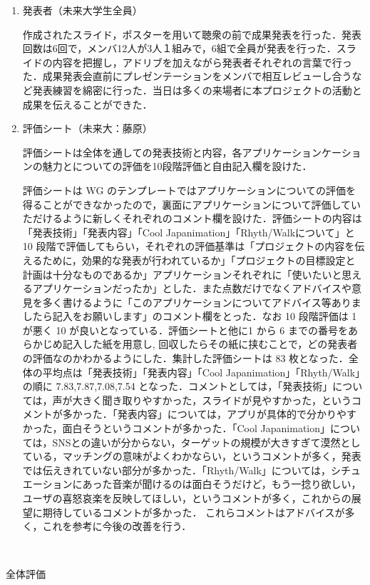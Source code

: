 \begin{enumerate}
\item 発表者（未来大学生全員）
\par
作成されたスライド，ポスターを用いて聴衆の前で成果発表を行った．発表回数は6回で，メンバ12人が3人１組みで，6組で全員が発表を行った．スライドの内容を把握し，アドリブを加えながら発表者それぞれの言葉で行った．成果発表会直前にプレゼンテーションをメンバで相互レビューし合うなど発表練習を綿密に行った．当日は多くの来場者に本プロジェクトの活動と成果を伝えることができた．
\item 評価シート（未来大：藤原）
\par
評価シートは全体を通しての発表技術と内容，各アプリケーションケーションの魅力とについての評価を10段階評価と自由記入欄を設けた．

評価シートは WG のテンプレートではアプリケーションについての評価を得ることができなかったので，裏面にアプリケーションについて評価していただけるように新しくそれぞれのコメント欄を設けた．評価シートの内容は「発表技術」「発表内容」「Cool Japanimation」「Rhyth/Walkについて」と 10 段階で評価してもらい，それぞれの評価基準は「プロジェクトの内容を伝えるために，効果的な発表が行われているか」「プロジェクトの目標設定と計画は十分なものであるか」アプリケーションそれぞれに「使いたいと思えるアプリケーションだったか」とした．また点数だけでなくアドバイスや意見を多く書けるように「このアプリケーションについてアドバイス等ありましたら記入をお願いします」のコメント欄をとった．なお 10 段階評価は 1 が悪く 10 が良いとなっている．評価シートと他に1 から 6 までの番号をあらかじめ記入した紙を用意し, 回収したらその紙に挟むことで，どの発表者の評価なのかわかるようにした．集計した評価シートは 83 枚となった．全体の平均点は「発表技術」「発表内容」「Cool Japanimation」「Rhyth/Walk」の順に 7.83,7.87,7.08,7.54 となった．コメントとしては，「発表技術」については，声が大きく聞き取りやすかった，スライドが見やすかった，というコメントが多かった．「発表内容」については，アプリが具体的で分かりやすかった，面白そうというコメントが多かった．「Cool Japanimation」については，SNSとの違いが分からない，ターゲットの規模が大きすぎて漠然としている，マッチングの意味がよくわかならい，というコメントが多く，発表では伝えきれていない部分が多かった．「Rhyth/Walk」については，シチュエーションにあった音楽が聞けるのは面白そうだけど，もう一捻り欲しい，ユーザの喜怒哀楽を反映してほしい，というコメントが多く，これからの展望に期待しているコメントが多かった．
これらコメントはアドバイスが多く，これを参考に今後の改善を行う．


\end{enumerate}　
\par
全体評価
\par

